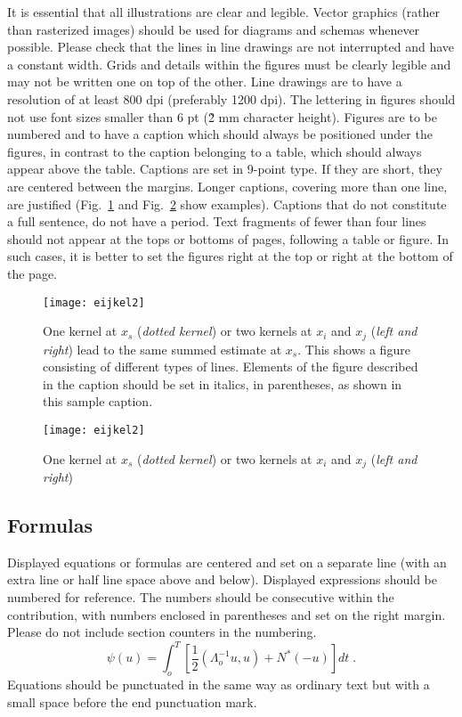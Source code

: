 \documentclass[runningheads]{llncs}
\begin{document}
	It is essential that all illustrations are clear and legible.
	Vector graphics (rather than rasterized images) should be used for diagrams and schemas whenever possible.
	Please check that the lines in line drawings are not interrupted and have a constant width.
	Grids and details within the figures must be clearly legible and may not be written one on top of the other.
	Line drawings are to have a resolution of at least 800 dpi (preferably 1200 dpi).
	The lettering in figures should not use font sizes smaller than 6 pt (\~ 2 mm character height).
	Figures are to be numbered and to have a caption which should always be positioned under the figures, in contrast to the caption belonging to a table, which should always appear above the table.
	Captions are set in 9-point type.
	If they are short, they are centered between the margins.
	Longer captions, covering more than one line, are justified (Fig.~\ref{fig:example1} and Fig.~\ref{fig:example2} show examples).
	Captions that do not constitute a full sentence, do not have a period.
	Text fragments of fewer than four lines should not appear at the tops or bottoms of pages, following a table or figure.
	In such cases, it is better to set the figures right at the top or right at the bottom of the page.

	\begin{figure}[t]
	\centering
		\texttt{[image: eijkel2]}
		\caption{
			One kernel at $x_s$ ({\it dotted kernel}) or two kernels at $x_i$ and $x_j$ ({\it left and right}) lead to the same summed estimate at $x_s$.
			This shows a figure consisting of different types of lines.
			Elements of the figure described in the caption should be set in italics, in parentheses, as shown in this sample caption.
		}
		\label{fig:example1}
	\end{figure}

	\begin{figure}[t]
		\centering
		\texttt{[image: eijkel2]}
		\caption{One kernel at $x_s$ ({\it dotted kernel}) or two kernels at $x_i$ and $x_j$ ({\it left and right})}
		\label{fig:example2}
	\end{figure}

	\subsection{Formulas}
	Displayed equations or formulas are centered and set on a separate line (with an extra line or half line space above and below).
	Displayed expressions should be numbered for reference.
	The numbers should be consecutive within the contribution, with numbers enclosed in parentheses and set on the right margin.
	Please do not include section counters in the numbering.
	\begin{equation}
		\psi (u) = \int_{o}^{T} \left[
			\frac{1}{2} \left(\Lambda_{o}^{-1} u,u\right) + N^{\ast} (-u)
		\right] dt \;  .
	\end{equation}
	Equations should be punctuated in the same way as ordinary text but with a small space before the end punctuation mark.
\end{document}
